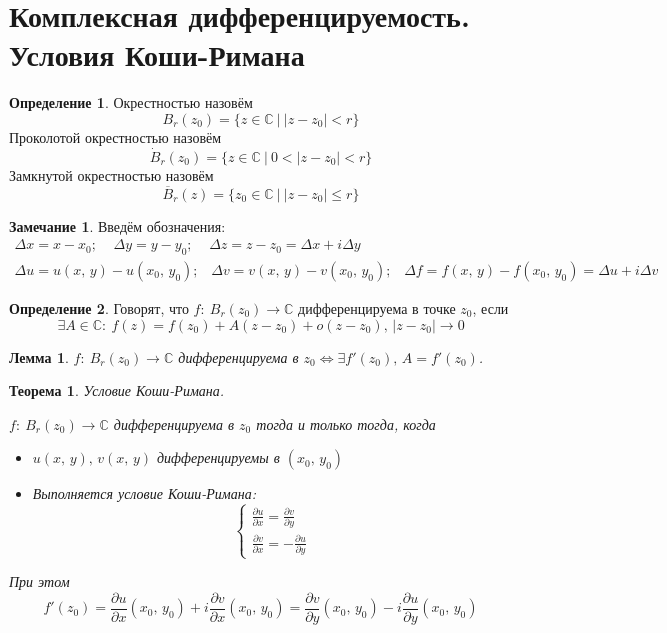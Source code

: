\documentclass[a4paper,12pt]{article}
\renewcommand{\leq}{\ensuremath{\leqslant}}
\theoremstyle{plain}
\newtheorem{theorem}{Теорема}[section]
\newtheorem{lemma}{Лемма}[section]
\theoremstyle{definition}
\newtheorem{definition}{Определение}[section]
\newtheorem*{note}{Замечание}
\theoremstyle{remark}
\begin{document}
\tableofcontents
\newpage

\section{Комплексная дифференцируемость. Условия Коши-Римана}
\begin{definition}
	Окрестностью назовём
	\[
		B_r(z_0) = \{z \in \mathbb{C} \:\vert\: \vert z - z_0\vert < r\}
	\]
	Проколотой окрестностью назовём
	\[
		\dot{B}_r(z_0) = \{z \in \mathbb{C} \:\vert\: 0 < \vert z - z_0\vert < r\}
	\]
	Замкнутой окрестностью назовём
	\[
		\overline{B}_r(z) = \{z_0 \in \mathbb{C} \:\vert\: \vert z - z_0\vert \leq r\}
	\]
\end{definition}

\begin{note}
	Введём обозначения:
	\begin{align*}
		\Delta x = x - x_0 ;\;\;\;\; \Delta y = y - y_0 ;\;\;\;\; \Delta z = z - z_0 = \Delta x + i\Delta y \\
		\Delta u = u(x,\,y) - u(x_0,\,y_0);\;\;\; \Delta v = v(x,\,y) - v(x_0,\, y_0) ;\;\;\; \Delta f = f(x,\, y) - f(x_0,\, y_0) = \Delta u + i\Delta v
	\end{align*}
\end{note}

\begin{definition}
	Говорят, что $f :\: B_r(z_0) \to \mathbb{C}$ дифференцируема в точке $z_0$, если
	\[
		\exists A \in \mathbb{C} :\: f(z) = f(z_0) + A(z - z_0) + o(z - z_0),\, \vert z - z_0\vert \to 0
	\]
\end{definition}

\begin{lemma}
	$f :\: B_r(z_0) \to \mathbb{C}$ дифференцируема в $z_0 \Leftrightarrow \exists f'(z_0),\, A = f'(z_0)$.
\end{lemma}

\begin{theorem}
	Условие Коши-Римана.

	$f :\: B_r(z_0) \to \mathbb{C}$ дифференцируема в $z_0$ тогда и только тогда, когда
	\begin{itemize}
		\item $u(x,\, y),\, v(x,\, y)$ дифференцируемы в $(x_0,\, y_0)$
		\item Выполняется условие Коши-Римана:
		      \[
			      \begin{cases}
				      \frac{\partial u}{\partial x} = \frac{\partial v}{\partial y} \\
				      \frac{\partial v}{\partial x} = -\frac{\partial u}{\partial y}
			      \end{cases}
		      \]
	\end{itemize}
	При этом
	\[
		f'(z_0) = \frac{\partial u}{\partial x}(x_0,\, y_0) + i\frac{\partial v}{\partial x}(x_0,\, y_0) = \frac{\partial v}{\partial y}(x_0,\, y_0) - i\frac{\partial u}{\partial y}(x_0,\, y_0)
	\]
\end{theorem}
\end{document}
